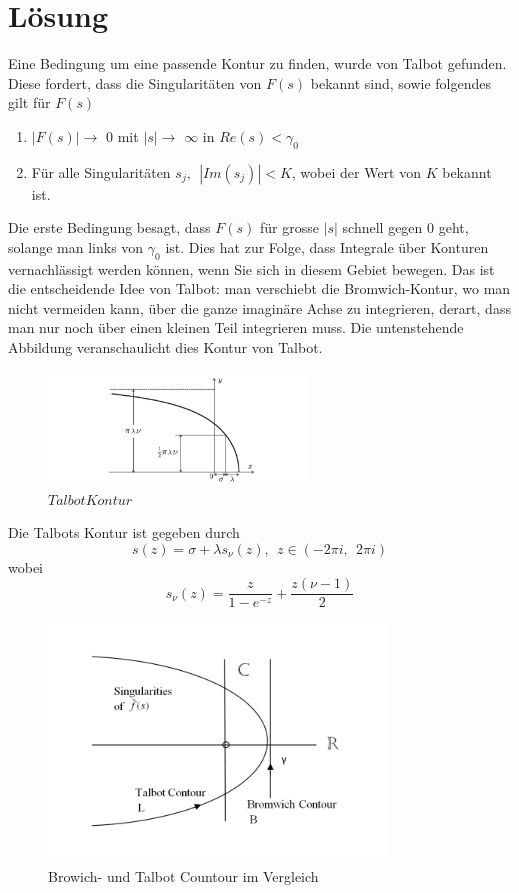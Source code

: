 %
%
%


\section{Lösung}
\label{laplace:section:Methode nach Talbot}
Eine Bedingung um eine passende Kontur zu finden, wurde von Talbot gefunden.
Diese fordert, dass die Singularitäten von $F(s)$ bekannt sind, sowie folgendes gilt für $F(s)$
\begin{enumerate}
\item
$|F(s)|\rightarrow$ 0 mit $|s|\rightarrow$ $\infty$ in $Re(s)<\gamma_{0}$
\item
Für alle Singularitäten $s_{j},~~|Im(s_{j})|<K$, wobei der Wert von $K$ bekannt ist.
\end{enumerate}

Die erste Bedingung besagt, dass $F(s)$ für grosse $|s|$ schnell gegen $0$ geht, solange man links von $\gamma_{0}$ ist. Dies hat zur Folge, dass Integrale über Konturen vernachlässigt werden können, wenn Sie sich in diesem Gebiet bewegen. Das ist die entscheidende Idee von Talbot: man verschiebt die Bromwich-Kontur, wo man nicht vermeiden kann, über die ganze imaginäre Achse zu integrieren, derart, dass man nur noch über einen kleinen Teil integrieren muss. Die untenstehende Abbildung veranschaulicht dies Kontur von Talbot.

\begin{figure}
\centering
\includegraphics[width=6.9cm]{papers/laplace/Talbot_Contour.png}
\caption{$Talbot Kontur$}
\label{laplace:talbotkontur}
\end{figure}

Die Talbots Kontur ist gegeben durch
\[
s(z) = \sigma+\lambda s_{\nu}(z),~~ z\in (-2\pi i,~~2\pi i)
\]
wobei
\[
s_{\nu}(z)=\frac{z}{1-e^{-z}}+\frac{z(\nu-1)}{2}
\]
\begin{figure}
\centering
\includegraphics[width=0.8\textwidth]{papers/laplace/Bromwich_Talbot_Contour.PNG}
\caption{Browich- und Talbot Countour im Vergleich
\label{laplace:figure:countours}}
\end{figure}

